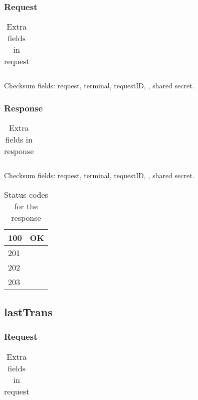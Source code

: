 \documentclass[a4paper,11pt]{article}
\newcommand{\code}[1]
   {\textsf{#1}}
\begin{document}
\subsubsection{Request}
\begin{table}[!h]
  \begin{tabular}{|l|l|}
    \hline
       \\\hline
  \end{tabular} 
  \caption{Extra fields in \code{} request}
\end{table}

Checksum fields: request, terminal, requestID, , shared secret.

\subsubsection{Response}
\begin{table}[!h]
  \begin{tabular}{|l|l|}
    \hline
       \\\hline
  \end{tabular} 
  \caption{Extra fields in \code{} response}
\end{table}

Checksum fields: request, terminal, requestID, , shared secret.

\begin{table}[!h]
  \begin{tabular}{|l|l|}
    \hline
      100  & OK \\\hline
      201  & \\\hline
      202  & \\\hline
      203  & \\\hline
  \end{tabular} 
  \caption{Status codes for the \code{} response}
\end{table}


\subsection{lastTrans}

\subsubsection{Request}
\begin{table}[!h]
  \begin{tabular}{|l|l|}
    \hline
       \\\hline
  \end{tabular} 
  \caption{Extra fields in \code{} request}
\end{table}
\end{document}
